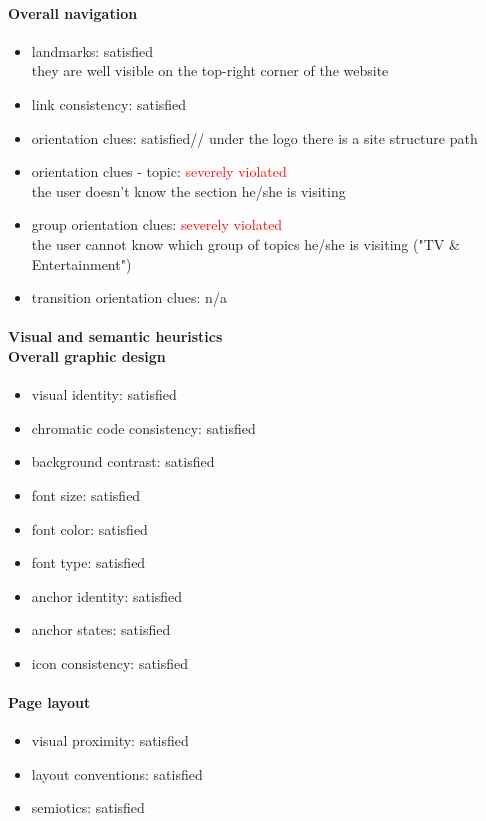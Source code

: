 \begin{enumerate}
	\paragraph*{Overall navigation}
	\begin{itemize}
		\item landmarks: satisfied\\
		they are well visible on the top-right corner of the website
		\item link consistency: satisfied
		\item orientation clues: satisfied//
		under the logo there is a site structure path
		\item orientation clues - topic: \textcolor{red}{severely violated}\\
		the user doesn't know the section he/she is visiting
		\item group orientation clues:  \textcolor{red}{severely violated}\\
		the user cannot know which group of topics he/she is visiting ("TV \& Entertainment")
		\item transition orientation clues: n/a
	\end{itemize}	
	
	\paragraph*{Visual and semantic heuristics \\ Overall graphic design }
	\begin{itemize}
		\item visual identity: satisfied
		\item chromatic code consistency: satisfied
		\item background contrast: satisfied
		\item font size: satisfied
		\item font color: satisfied
		\item font type: satisfied
		\item anchor identity: satisfied
		\item anchor states: satisfied
		\item icon consistency: satisfied
	\end{itemize}
	
	\paragraph*{Page layout}
	\begin{itemize}
		\item visual proximity: satisfied
		\item layout conventions: satisfied
		\item semiotics: satisfied
	\end{itemize}	
	

\end{enumerate}
